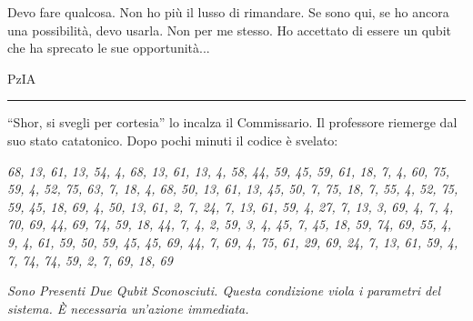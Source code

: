 Devo fare qualcosa. Non ho più il lusso di rimandare. Se sono qui, se ho ancora una possibilità, devo usarla. Non per me stesso. Ho accettato di essere un qubit che ha sprecato le sue opportunità...
\begin{center}
\begin{minipage}{0.7\textwidth}
    \centering
\end{minipage}
\end{center}
\vspace{1em}
\begin{center}PzIA\end{center}
\hrule
\vspace{1em}
\enquote{Shor, si svegli per cortesia} lo incalza il Commissario. Il professore riemerge dal suo stato catatonico. Dopo pochi minuti il codice è svelato:

\begin{tcolorbox}[colback=white!95!blue!5, colframe=blue!75!black, title=\textbf{Messaggio Criptato con RSA}, fonttitle=\bfseries]
\emph{68, 13, 61, 13, 54, 4, 68, 13, 61, 13, 4, 58, 44, 59, 45, 59, 61, 18, 7, 4, 60, 75, 59, 4, 52, 75, 63, 7, 18, 4, 68, 50, 13, 61, 13, 45, 50, 7, 75, 18, 7, 55, 4, 52, 75, 59, 45, 18, 69, 4, 50, 13, 61, 2, 7, 24, 7, 13, 61, 59, 4, 27, 7, 13, 3, 69, 4, 7, 4, 70, 69, 44, 69, 74, 59, 18, 44, 7, 4, 2, 59, 3, 4, 45, 7, 45, 18, 59, 74, 69, 55, 4, 9, 4, 61, 59, 50, 59, 45, 45, 69, 44, 7, 69, 4, 75, 61, 29, 69, 24, 7, 13, 61, 59, 4, 7, 74, 74, 59, 2, 7, 69, 18, 69}
 
\end{tcolorbox}

\begin{tcolorbox}[colback=white!95!green!5, colframe=green!75!black, title=\textbf{Messaggio Decriptato}, fonttitle=\bfseries]
\emph{Sono Presenti Due Qubit Sconosciuti. Questa condizione viola i parametri del sistema. È necessaria un’azione immediata.}
\end{tcolorbox}

